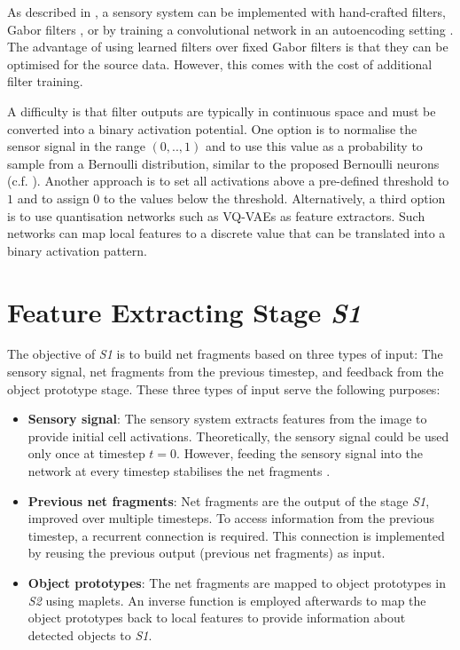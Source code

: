 As described in , a sensory system can be implemented with hand-crafted filters, Gabor filters \cite{gabor_theory_1946, granlund_search_1978}, or by training a convolutional network  in an autoencoding setting . The advantage of using learned filters over fixed Gabor filters is that they can be optimised for the source data. However, this comes with the cost of additional filter training.

A difficulty is that filter outputs are typically in continuous space and must be converted into a binary activation potential.
One option is to normalise the sensor signal in the range $(0, .., 1)$ and to use this value as a probability to sample from a Bernoulli distribution, similar to the proposed Bernoulli neurons (c.f. ).
Another approach is to set all activations above a pre-defined threshold to $1$ and to assign 0 to the values below the threshold.
Alternatively, a third option is to use quantisation networks such as VQ-VAEs  as feature extractors. Such networks can map local features to a discrete value that can be translated into a binary activation pattern.


\section{Feature Extracting Stage \emph{S1}}
The objective of \emph{S1} is to build net fragments based on three types of input: The sensory signal, net fragments from the previous timestep, and feedback from the object prototype stage.
These three types of input serve the following purposes:
\begin{itemize}
    \item \textbf{Sensory signal}: The sensory system extracts features from the image to provide initial cell activations. Theoretically, the sensory signal could be used only once at timestep $t=0$. However, feeding the sensory signal into the network at every timestep stabilises the net fragments .
    \item \textbf{Previous net fragments}: Net fragments are the output of the stage \emph{S1}, improved over multiple timesteps.
    To access information from the previous timestep, a recurrent connection is required. This connection is implemented by reusing the previous output (previous net fragments) as input.
    \item \textbf{Object prototypes}: The net fragments are mapped to object prototypes in \emph{S2} using maplets. An inverse function is employed afterwards to map the object prototypes back to local features to provide information about detected objects to \emph{S1}.
\end{itemize}

